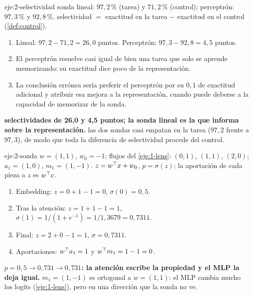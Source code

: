\begin{solucion}{eje:2-selectividad}
\datos sonda lineal: $97{,}2\,\%$ (tarea) y $71{,}2\,\%$ (control); perceptrón: $97{,}3\,\%$ y $92{,}8\,\%$.
\planteamiento selectividad $=$ exactitud en la tarea $-$ exactitud en el control (\cref{def:control}).
\pasos
\begin{enumerate}[label=\arabic*.]
  \item Lineal: $97{,}2-71{,}2=26{,}0$ puntos. Perceptrón: $97{,}3-92{,}8=4{,}5$ puntos.
  \item El perceptrón resuelve casi igual de bien una tarea que solo se aprende memorizando: su exactitud dice poco de la representación.
  \item La conclusión errónea sería preferir el perceptrón por su $0{,}1$ de exactitud adicional y atribuir esa mejora a la representación, cuando puede deberse a la capacidad de memorizar de la sonda.
\end{enumerate}
\resultado \textbf{selectividades de 26{,}0 y 4{,}5 puntos; la sonda lineal es la que informa sobre la representación.}
\comprobacion las dos sondas casi empatan en la tarea ($97{,}2$ frente a $97{,}3$), de modo que toda la diferencia de selectividad procede del control.
\end{solucion}

\begin{solucion}{eje:2-sonda}
\datos $w=(1,1)$, $w_0=-1$; flujos del \cref{eje:1-lens}: $(0,1)$, $(1,1)$, $(2,0)$; $a_1=(1,0)$, $m_1=(1,-1)$.
\planteamiento $z=w^{\top} x+w_0$, $p=\sigma(z)$; la aportación de cada pieza a $z$ es $w^{\top} c$.
\pasos
\begin{enumerate}[label=\arabic*.]
  \item Embedding: $z=0+1-1=0$, $\sigma(0)=0{,}5$.
  \item Tras la atención: $z=1+1-1=1$, $\sigma(1)=1/(1+e^{-1})=1/1{,}3679=0{,}7311$.
  \item Final: $z=2+0-1=1$, $\sigma=0{,}7311$.
  \item Aportaciones: $w^{\top} a_1=1$ y $w^{\top} m_1=1-1=0$.
\end{enumerate}
\resultado \textbf{$p=0{,}5\to 0{,}731\to 0{,}731$: la atención escribe la propiedad y el MLP la deja igual.}
\comprobacion $m_1=(1,-1)$ es ortogonal a $w=(1,1)$: el MLP cambia mucho los logits (\cref{eje:1-lens}), pero en una dirección que la sonda no ve.
\end{solucion}

